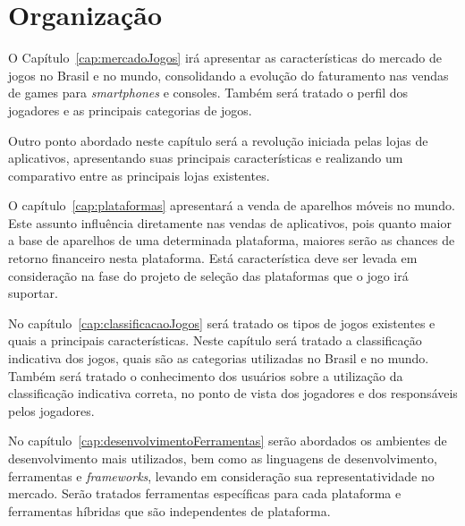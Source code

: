 
\section{Organização}


O Capítulo~\ref{cap:mercadoJogos} irá apresentar as características do mercado de jogos no Brasil e no mundo, consolidando a evolução do faturamento nas vendas de games para \emph{smartphones} e consoles. Também será tratado o perfil dos jogadores e as principais categorias de jogos.

Outro ponto abordado neste capítulo será a revolução iniciada pelas lojas de aplicativos, apresentando suas principais características e realizando um comparativo entre as principais lojas existentes.




O capítulo~\ref{cap:plataformas} apresentará a venda de aparelhos móveis no mundo. Este assunto influência diretamente nas vendas de aplicativos, pois quanto maior a base de aparelhos de uma determinada plataforma, maiores serão as chances de retorno financeiro nesta plataforma. Está característica deve ser levada em consideração na fase do projeto de seleção das plataformas que o jogo irá suportar.






No capítulo~\ref{cap:classificacaoJogos} será tratado os tipos de jogos existentes e quais a principais características.
Neste capítulo será tratado a classificação indicativa dos jogos, quais são as categorias utilizadas no Brasil e no mundo. Também será tratado o conhecimento dos usuários sobre a utilização da classificação indicativa correta, no ponto de vista dos jogadores e dos responsáveis pelos jogadores.



No capítulo~\ref{cap:desenvolvimentoFerramentas} serão abordados os ambientes de desenvolvimento mais utilizados, bem como as linguagens de desenvolvimento, ferramentas e \emph{frameworks}, levando em consideração sua representatividade no mercado. Serão tratados ferramentas específicas para cada plataforma e ferramentas híbridas que são independentes de plataforma.


